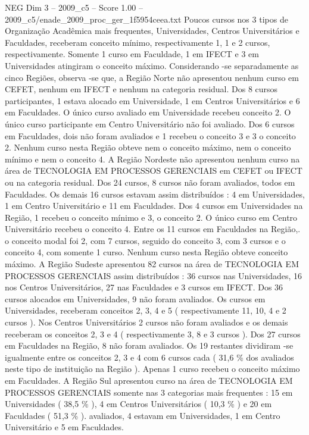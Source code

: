 \begin{textsample}{NEG Dim 3 – 2009\_c5 – Score 1.00 – 2009\_c5/enade\_2009\_proc\_ger\_1f5954ceea.txt}
Poucos cursos nos 3 tipos de Organização Acadêmica mais frequentes, Universidades, Centros Universitários e Faculdades, receberam conceito mínimo, respectivamente 1, 1 e 2 cursos, respectivamente.
Somente 1 curso em Faculdade, 1 em IFECT e 3 em Universidades atingiram o conceito máximo.
Considerando -se separadamente as cinco Regiões, observa -se que, a Região Norte não apresentou nenhum curso em CEFET, nenhum em IFECT e nenhum na categoria residual.
Dos 8 cursos participantes, 1 estava alocado em Universidade, 1 em Centros Universitários e 6 em Faculdades.
O único curso avaliado em Universidade recebeu conceito 2.
O único curso participante em Centro Universitário não foi avaliado.
Dos 6 cursos em Faculdades, dois não foram avaliados e 1 recebeu o conceito 3 e 3 o conceito 2.
Nenhum curso nesta Região obteve nem o conceito máximo, nem o conceito mínimo e nem o conceito 4.
A Região Nordeste não apresentou nenhum curso na área de TECNOLOGIA EM PROCESSOS GERENCIAIS em CEFET ou IFECT ou na categoria residual.
Dos 24 cursos, 8 cursos não foram avaliados, todos em Faculdades.
Os demais 16 cursos estavam assim distribuídos : 4 em Universidades, 1 em Centro Universitário e 11 em Faculdades.
Dos 4 cursos em Universidades na Região, 1 recebeu o conceito mínimo e 3, o conceito 2.
O único curso em Centro Universitário recebeu o conceito 4.
Entre os 11 cursos em Faculdades na Região,. o conceito modal foi 2, com 7 cursos, seguido do conceito 3, com 3 cursos e o conceito 4, com somente 1 curso.
Nenhum curso nesta Região obteve conceito máximo.
A Região Sudeste apresentou 82 cursos na área de TECNOLOGIA EM PROCESSOS GERENCIAIS assim distribuídos : 36 cursos nas Universidades, 16 nos Centros Universitários, 27 nas Faculdades e 3 cursos em IFECT.
Dos 36 cursos alocados em Universidades, 9 não foram avaliados.
Os cursos em Universidades, receberam conceitos 2, 3, 4 e 5 ( respectivamente 11, 10, 4 e 2 cursos ).
Nos Centros Universitários 2 cursos não foram avaliados e os demais receberam os conceitos 2, 3 e 4 ( respectivamente 3, 8 e 3 cursos ).
Dos 27 cursos em Faculdades na Região, 8 não foram avaliados.
Os 19 restantes dividiram -se igualmente entre os conceitos 2, 3 e 4 com 6 cursos cada ( 31,6 \% dos avaliados neste tipo de instituição na Região ).
Apenas 1 curso recebeu o conceito máximo em Faculdades.
A Região Sul apresentou curso na área de TECNOLOGIA EM PROCESSOS GERENCIAIS somente nas 3 categorias mais frequentes : 15 em Universidades ( 38,5 \% ), 4 em Centros Universitários ( 10,3 \% ) e 20 em Faculdades ( 51,3 \% ). avaliados, 4 estavam em Universidades, 1 em Centro Universitário e 5 em Faculdades.

\end{textsample}
